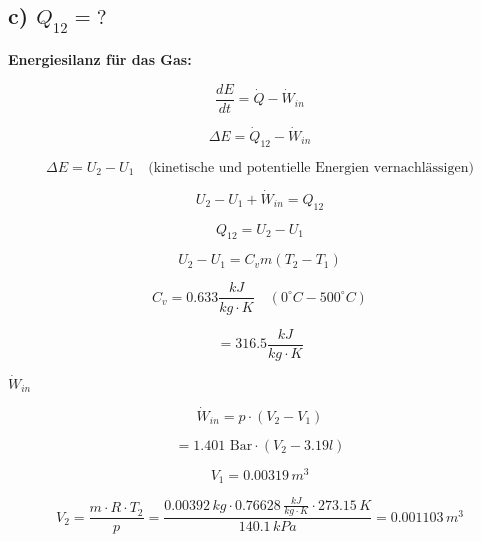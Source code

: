 \subsection*{c) $Q_{12} = ?$}

\textbf{Energiesilanz für das Gas:}

\begin{equation*}
\frac{dE}{dt} = \dot{Q} - \dot{W}_{in}
\end{equation*}

\begin{equation*}
\Delta E = \dot{Q}_{12} - \dot{W}_{in}
\end{equation*}

\begin{equation*}
\Delta E = U_2 - U_1 \quad \text{(kinetische und potentielle Energien vernachlässigen)}
\end{equation*}

\begin{equation*}
U_2 - U_1 + \dot{W}_{in} = Q_{12}
\end{equation*}

\begin{equation*}
Q_{12} = U_2 - U_1
\end{equation*}

\begin{equation*}
U_2 - U_1 = C_v m (T_2 - T_1)
\end{equation*}

\begin{equation*}
C_v = 0.633 \frac{kJ}{kg \cdot K} \quad (0^\circ C - 500^\circ C)
\end{equation*}

\begin{equation*}
= 316.5 \frac{kJ}{kg \cdot K}
\end{equation*}

\textbf{$\dot{W}_{in}$} \quad {}

\begin{equation*}
\dot{W}_{in} = p \cdot (V_2 - V_1)
\end{equation*}

\begin{equation*}
= 1.401 \text{ Bar} \cdot (V_2 - 3.19 l)
\end{equation*}

\begin{equation*}
V_1 = 0.00319 \, m^3
\end{equation*}

\begin{equation*}
V_2 = \frac{m \cdot R \cdot T_2}{p} = \frac{0.00392 \, kg \cdot 0.76628 \, \frac{kJ}{kg \cdot K} \cdot 273.15 \, K}{140.1 \, kPa} = 0.001103 \, m^3
\end{equation*}

